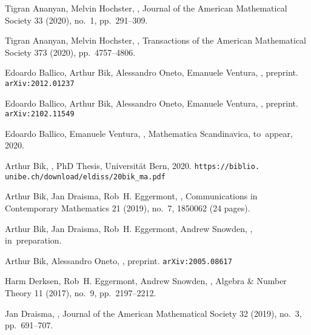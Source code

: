 \documentclass{amsart}
\theoremstyle{plain}
\theoremstyle{definition}
\begin{document}
\begin{thebibliography}{99}

Tigran Ananyan, Melvin Hochster,
,
\newblock Journal of the American Mathematical Society 33 (2020), no.~1, pp.~291--309.

Tigran Ananyan, Melvin Hochster,
,
\newblock Transactions of the American Mathematical Society 373 (2020), pp.~4757--4806.

Edoardo Ballico, Arthur Bik, Alessandro Oneto, Emanuele Ventura,
,
\newblock preprint.
{\tt arXiv:2012.01237}

Edoardo Ballico, Arthur Bik, Alessandro Oneto, Emanuele Ventura,
,
\newblock preprint.
{\tt arXiv:2102.11549}

Edoardo Ballico, Emanuele Ventura,
,
\newblock Mathematica Scandinavica, to~appear, 2020.

Arthur Bik,
,
\newblock PhD Thesis, Universit{\"a}t Bern, 2020.
\verb|https://biblio.| \verb|unibe.ch/download/eldiss/20bik_ma.pdf|

Arthur Bik, Jan Draisma, Rob~H. Eggermont,
,
\newblock Communications in Contemporary Mathematics 21 (2019), no.~7, 1850062 (24 pages).

Arthur Bik, Jan Draisma, Rob~H. Eggermont, Andrew Snowden,
,
\newblock in~preparation.

Arthur Bik, Alessandro Oneto,
,
\newblock preprint.
{\tt arXiv:2005.08617}

Harm Derksen, Rob~H. Eggermont, Andrew Snowden,
,
\newblock Algebra \& Number Theory 11 (2017), no.~9, pp.~2197--2212.

Jan Draisma,
,
\newblock Journal of the American Mathematical Society 32 (2019), no.~3, pp.~691--707.


\end{thebibliography}
\end{document}
